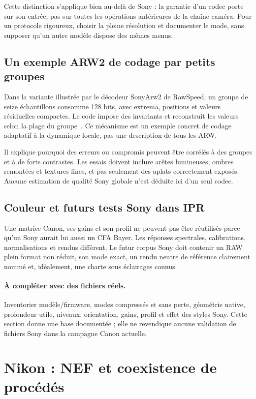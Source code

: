 Cette distinction s'applique bien au-delà de Sony :
la garantie d'un codec porte sur son entrée, pas sur
toutes les opérations antérieures de la chaîne caméra.
Pour un protocole rigoureux, choisir la pleine résolution
et documenter le mode, sans supposer qu'un autre modèle
dispose des mêmes menus.

\subsection{Un exemple ARW2 de codage par petits groupes}
Dans la variante illustrée par le décodeur SonyArw2
de RawSpeed, un groupe de seize échantillons consomme
128 bits, avec extrema, positions et valeurs résiduelles
compactes. Le code impose des invariants et reconstruit
les valeurs selon la plage du groupe~\cite{sonyarw2}.
Ce mécanisme est un exemple concret de codage adaptatif
à la dynamique locale, pas une description de tous les ARW.

Il explique pourquoi des erreurs ou compromis peuvent
être corrélés à des groupes et à de forts contrastes.
Les essais doivent inclure arêtes lumineuses, ombres
remontées et textures fines, et pas seulement des
aplats correctement exposés. Aucune estimation de
qualité Sony globale n'est déduite ici d'un seul codec.

\subsection{Couleur et futurs tests Sony dans IPR}
Une matrice Canon, ses gains et son profil ne peuvent
pas être réutilisés parce qu'un Sony aurait lui aussi
un CFA Bayer. Les réponses spectrales, calibrations,
normalisations et rendus diffèrent. Le futur corpus
Sony doit contenir un RAW plein format non réduit,
son mode exact, un rendu neutre de référence clairement
nommé et, idéalement, une charte sous éclairages connus.

\paragraph{À compléter avec des fichiers réels.} Inventorier
modèle/firmware, modes compressés et sans perte, géométrie
native, profondeur utile, niveaux, orientation, gains,
profil et effet des styles Sony. Cette section donne
une base documentée ; elle ne revendique aucune validation
de fichiers Sony dans la campagne Canon actuelle.

\section{Nikon : NEF et coexistence de procédés}
